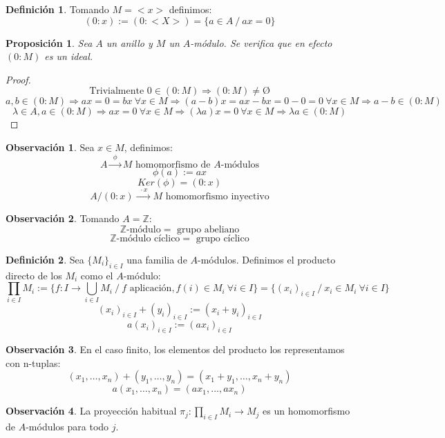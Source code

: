 \documentclass{article}
\theoremstyle{theorem-style}  %
\newtheorem{proposition}[theorem]{Proposición}
\theoremstyle{definition}
\newtheorem{definition}{Definición}[section]
\newtheorem*{observation}{Observación} %
\theoremstyle{example-style}
\begin{document}
\begin{definition}
	Tomando $M=<x>$ definimos:
	\[(0:x):=(0:<X>)=\{a\in A \ / \ ax=0\}\]
\end{definition}

\begin{proposition}
	Sea $A$ un anillo y $M$ un $A$-módulo. Se verifica que en efecto $(0:M)$ es un ideal.
\end{proposition}

\begin{proof}
	\[ \text{Trivialmente } 0 \in (0:M) \Rightarrow (0:M) \neq \text{\O}\]
	\[ a,b \in (0:M) \Rightarrow ax=0=bx \ \forall x \in M \Rightarrow (a-b)x=ax-bx=0-0=0 \ \forall x \in M \Rightarrow a-b \in (0:M) \]
	\[ \lambda \in A, a \in (0:M) \Rightarrow ax=0 \ \forall x \in M \Rightarrow (\lambda a)x=0 \ \forall x \in M \Rightarrow \lambda a \in (0:M) \]
\end{proof}

\begin{observation}
	Sea $x \in M$, definimos:
	\[ A\xrightarrow{\ \ \phi \ \ } M \text{ homomorfismo de $A$-módulos}\]
	\[ \phi(a):=ax\]
	\[ Ker(\phi)=(0:x)\]
	\[A/(0:x)\xrightarrow{\ \ \cdot x\ \ }M \text{ homomorfismo inyectivo}\]
\end{observation}

\begin{observation}
	Tomando $A=\mathbb{Z}$:
	\[ \mathbb{Z}\text{-módulo}=\text{ grupo abeliano}\]
	\[ \mathbb{Z}\text{-módulo cíclico}=\text{ grupo cíclico}\]
\end{observation}

\begin{definition}
	Sea $\{M_i\}_{i\in I}$ una familia de $A$-módulos. Definimos el producto directo de los $M_i$ como el $A$-módulo:
	\[ \prod_{i\in I}M_i := \{f:I\rightarrow\bigcup_{i\in I}M_i \ / \ \text{$f$ aplicación}, f(i)\in M_i \ \forall i \in I\} = \{(x_i)_{i\in I} \ / \ x_i \in M_i \ \forall i \in I\}\]
	\[(x_i)_{i\in I} + (y_i)_{i\in I} := (x_i + y_i)_{i\in I}\]
	\[a(x_i)_{i\in I} := (ax_i)_{i\in I}\]
\end{definition}

\begin{observation}
	En el caso finito, los elementos del producto los representamos con n-tuplas:
	\[(x_1,\dots,x_n)+(y_1,\dots,y_n)=(x_1+y_1,\dots,x_n+y_n)\]
	\[a(x_1,\dots,x_n)=(ax_1,\dots,ax_n)\]
\end{observation}

\begin{observation}
	La proyección habitual $\pi_j:\prod_{i\in I}M_i \longrightarrow M_j$ es un homomorfismo de $A$-módulos para todo $j$.
\end{observation}
\end{document}
